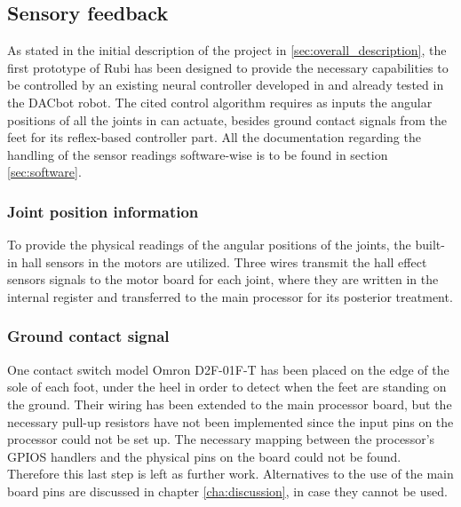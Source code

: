 
\subsection{Sensory feedback} %
\label{sub:sensory_feedback}
As stated in the initial description of the project in \ref{sec:overall_description}, the first prototype of Rubi has been designed to provide the necessary capabilities to be controlled by an existing neural controller developed in \cite{dacbot1} and already tested in the DACbot robot.
The cited control algorithm requires as inputs the angular positions of all the joints in can actuate, besides ground contact signals from the feet for its reflex-based controller part.
All the documentation regarding the handling of the sensor readings software-wise is to be found in section \ref{sec:software}.


\subsubsection{Joint position information} %
\label{ssub:joint_position_feedback}
To provide the physical readings of the angular positions of the joints, the built-in hall sensors in the motors are utilized. 
Three wires transmit the hall effect sensors signals to the motor board for each joint, where they are written in the internal register and transferred to the main processor for its posterior treatment.

\subsubsection{Ground contact signal} %
\label{ssub:ground_contact_feedback}
One contact switch model Omron D2F-01F-T has been placed on the edge of the sole of each foot, under the heel in order to detect when the feet are standing on the ground. 
Their wiring has been extended to the main processor board, but the necessary pull-up resistors have not been implemented since the input pins on the processor could not be set up.
The necessary mapping between the processor's GPIOS handlers and the physical pins on the board could not be found.
Therefore this last step is left as further work.
Alternatives to the use of the main board pins are discussed in chapter \ref{cha:discussion}, in case they cannot be used.

